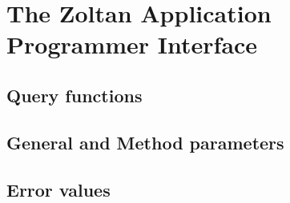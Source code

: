 %
%
\chapter{The Zoltan Application Programmer Interface}

\section{Query functions}

\section{General and Method parameters}

\section{Error values}

